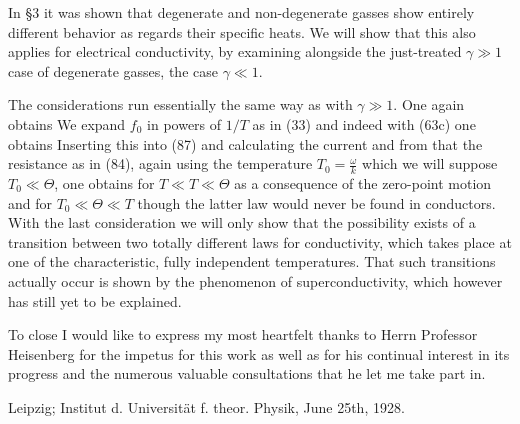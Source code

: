 \begin{paper}{1}
In \S3 it was shown that degenerate and non-degenerate gasses show entirely different behavior as regards their specific heats. We will show that this also applies for electrical conductivity, by examining alongside the just-treated $\gamma\gg 1$ case of degenerate gasses, the case $\gamma\ll 1$.

The considerations run essentially the same way as with $\gamma\gg 1$. One again obtains
We expand $f_0$ in powers of $1/T$ as in (33) and indeed with (63c) one obtains
Inserting this into (87) and calculating the current and from that the resistance as in (84), again using the temperature $T_0=\frac{\omega}{k}$ which we will suppose $T_0\ll\Theta$, one obtains for $T\ll T\ll\Theta$ as a consequence of the zero-point motion
and for $T_0\ll\Theta\ll T$
though the latter law would never be found in conductors. With the last consideration we will only show that the possibility exists of a transition between two totally different laws for conductivity, which takes place at one of the characteristic, fully independent temperatures. That such transitions actually occur is shown by the phenomenon of superconductivity, which however has still yet to be explained.

To close I would like to express my most heartfelt thanks to Herrn Professor Heisenberg for the impetus for this work as well as for his continual interest in its progress and the numerous valuable consultations that he let me take part in.

Leipzig; Institut d. Universit\"at f. theor. Physik, June 25th, 1928.


\end{paper}